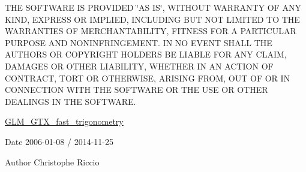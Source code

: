 T\+H\+E S\+O\+F\+T\+W\+A\+R\+E I\+S P\+R\+O\+V\+I\+D\+E\+D \char`\"{}\+A\+S I\+S\char`\"{}, W\+I\+T\+H\+O\+U\+T W\+A\+R\+R\+A\+N\+T\+Y O\+F A\+N\+Y K\+I\+N\+D, E\+X\+P\+R\+E\+S\+S O\+R I\+M\+P\+L\+I\+E\+D, I\+N\+C\+L\+U\+D\+I\+N\+G B\+U\+T N\+O\+T L\+I\+M\+I\+T\+E\+D T\+O T\+H\+E W\+A\+R\+R\+A\+N\+T\+I\+E\+S O\+F M\+E\+R\+C\+H\+A\+N\+T\+A\+B\+I\+L\+I\+T\+Y, F\+I\+T\+N\+E\+S\+S F\+O\+R A P\+A\+R\+T\+I\+C\+U\+L\+A\+R P\+U\+R\+P\+O\+S\+E A\+N\+D N\+O\+N\+I\+N\+F\+R\+I\+N\+G\+E\+M\+E\+N\+T. I\+N N\+O E\+V\+E\+N\+T S\+H\+A\+L\+L T\+H\+E A\+U\+T\+H\+O\+R\+S O\+R C\+O\+P\+Y\+R\+I\+G\+H\+T H\+O\+L\+D\+E\+R\+S B\+E L\+I\+A\+B\+L\+E F\+O\+R A\+N\+Y C\+L\+A\+I\+M, D\+A\+M\+A\+G\+E\+S O\+R O\+T\+H\+E\+R L\+I\+A\+B\+I\+L\+I\+T\+Y, W\+H\+E\+T\+H\+E\+R I\+N A\+N A\+C\+T\+I\+O\+N O\+F C\+O\+N\+T\+R\+A\+C\+T, T\+O\+R\+T O\+R O\+T\+H\+E\+R\+W\+I\+S\+E, A\+R\+I\+S\+I\+N\+G F\+R\+O\+M, O\+U\+T O\+F O\+R I\+N C\+O\+N\+N\+E\+C\+T\+I\+O\+N W\+I\+T\+H T\+H\+E S\+O\+F\+T\+W\+A\+R\+E O\+R T\+H\+E U\+S\+E O\+R O\+T\+H\+E\+R D\+E\+A\+L\+I\+N\+G\+S I\+N T\+H\+E S\+O\+F\+T\+W\+A\+R\+E.

\hyperlink{group__gtx__fast__trigonometry}{G\+L\+M\+\_\+\+G\+T\+X\+\_\+fast\+\_\+trigonometry}

\begin{DoxyDate}{Date}
2006-\/01-\/08 / 2014-\/11-\/25 
\end{DoxyDate}
\begin{DoxyAuthor}{Author}
Christophe Riccio 
\end{DoxyAuthor}
